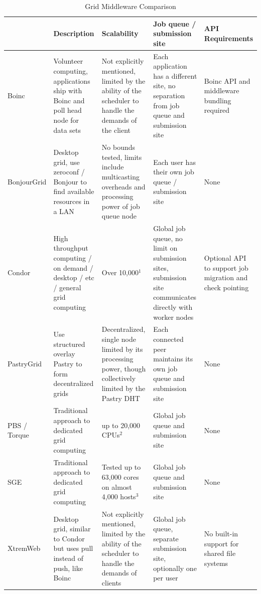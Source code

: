 \begin{center}
\begin{table}
\caption{Grid Middleware Comparison}
\footnotesize{
\begin{tabular}[c]{p{1.6cm}p{3.25cm}p{3.4cm}p{3.2cm}p{3.05cm}} \hline
& Description & Scalability & Job queue / submission site & API Requirements \\ \hline \hline
Boinc &
Volunteer computing, applications ship with Boinc and poll head node for data
sets &
Not explicitly mentioned, limited by the ability of the scheduler to handle
the demands of the client &
Each application has a different site, no separation from job queue and
submission site &
Boinc API and middleware bundling required
\\ \hline
BonjourGrid &
Desktop grid, use zeroconf / Bonjour to find available resources in a LAN &
No bounds tested, limits include multicasting overheads and processing power
of job queue node &
Each user has their own job queue / submission site &
None \\ \hline
Condor &
High throughput computing / on demand / desktop / etc / general grid computing &
Over 10,000$^{1}$ &
Global job queue, no limit on submission sites, submission site communicates directly with worker nodes &
Optional API to support job migration and check pointing \\ \hline
PastryGrid &
Use structured overlay Pastry to form decentralized grids &
Decentralized, single node limited by its processing power, though
collectively limited by the Pastry DHT &
Each connected peer maintains its own job queue and submission site &
None \\ \hline
PBS / Torque~\cite{torque} &
Traditional approach to dedicated grid computing &
up to 20,000 CPUs$^{2}$ &
Global job queue and submission site &
None
\\ \hline
SGE &
Traditional approach to dedicated grid computing &
Tested up to 63,000 cores on almost 4,000 hosts$^{3}$ &
Global job queue and submission site &
None
\\ \hline
XtremWeb &
Desktop grid, similar to Condor but uses pull instead of push, like Boinc &
Not explicitly mentioned, limited by the ability of the scheduler to handle
the demands of clients &
Global job queue, separate submission site, optionally one per user &
No built-in support for shared file systems
\\ \hline
\end{tabular}
}
\label{tab:grid}
\end{table}
\end{center}

